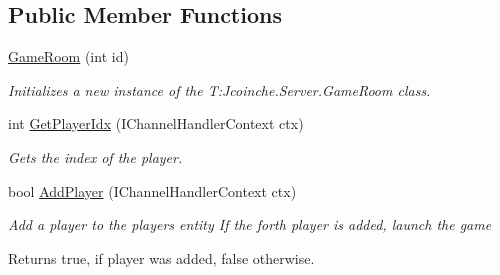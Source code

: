 \subsection*{Public Member Functions}
\begin{DoxyCompactItemize}
\item 
\hyperlink{class_coinche_1_1_server_1_1_game_room_a59f8c925feb3ae2db16fcc29f1118d30}{Game\+Room} (int id)
\begin{DoxyCompactList}\small\item\em Initializes a new instance of the T\+:\+Jcoinche.\+Server.\+Game\+Room class. \end{DoxyCompactList}\item 
int \hyperlink{class_coinche_1_1_server_1_1_game_room_a5294b7dc12a6040fb394be108f401b99}{Get\+Player\+Idx} (I\+Channel\+Handler\+Context ctx)
\begin{DoxyCompactList}\small\item\em Gets the index of the player. \end{DoxyCompactList}\item 
bool \hyperlink{class_coinche_1_1_server_1_1_game_room_af0a712bf9de4af9347667c506620f67e}{Add\+Player} (I\+Channel\+Handler\+Context ctx)
\begin{DoxyCompactList}\small\item\em Add a player to the players entity If the forth player is added, launch the game \begin{DoxyReturn}{Returns}
{\ttfamily true}, if player was added, {\ttfamily false} otherwise.
\end{DoxyReturn}


\end{DoxyCompactList}
\end{DoxyCompactItemize}
